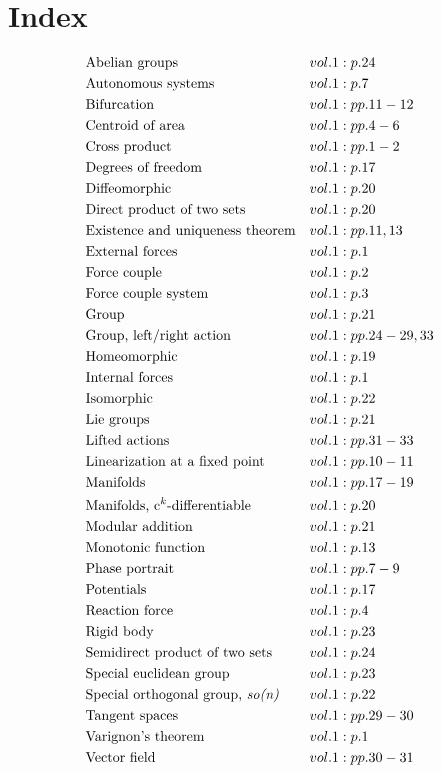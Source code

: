 \documentclass[a4paper]{article}
\begin{document}
 
\section*{Index} 
\begin{align*} 
&\text{Abelian groups}&& vol. 1: p. 24\\
&\text{Autonomous systems}&& vol. 1: p. 7\\
&\text{Bifurcation}&& vol. 1: pp. 11-12\\
&\text{Centroid of area}&& vol. 1: pp. 4-6\\
&\text{Cross product}&& vol. 1: pp. 1-2\\
&\text{Degrees of freedom}&& vol. 1: p. 17\\
&\text{Diffeomorphic}&& vol. 1: p. 20\\
&\text{Direct product of two sets}&& vol. 1: p. 20\\
&\text{Existence and uniqueness theorem}&& vol. 1: pp. 11, 13\\
&\text{External forces}&& vol. 1: p. 1\\
&\text{Force couple}&& vol. 1: p. 2\\
&\text{Force couple system}&& vol. 1: p. 3\\
&\text{Group}&& vol. 1: p. 21\\
&\text{Group, left/right action}&& vol. 1: pp. 24-29, 33\\
&\text{Homeomorphic}&& vol. 1: p. 19\\
&\text{Internal forces}&& vol. 1: p. 1\\
&\text{Isomorphic}&& vol. 1: p. 22\\
&\text{Lie groups}&& vol. 1: p. 21\\
&\text{Lifted actions}&& vol. 1: pp. 31-33\\
&\text{Linearization at a fixed point}&& vol. 1: pp. 10-11\\
&\text{Manifolds}&& vol. 1: pp. 17-19\\
&\text{Manifolds, c$^k$-differentiable}&& vol. 1: p. 20\\
&\text{Modular addition}&& vol. 1: p. 21\\
&\text{Monotonic function}&& vol. 1: p. 13\\
&\text{Phase portrait}&& vol. 1: pp. 7-9\\
&\text{Potentials}&& vol. 1: p. 17\\
&\text{Reaction force}&& vol. 1: p. 4\\
&\text{Rigid body}&& vol. 1: p. 23\\
&\text{Semidirect product of two sets}&& vol. 1: p. 24\\
&\text{Special euclidean group}&& vol. 1: p. 23\\
&\text{Special orthogonal group, \emph{so(n)}}&& vol. 1: p. 22\\
&\text{Tangent spaces}&& vol. 1: pp. 29-30\\
&\text{Varignon's theorem}&& vol. 1: p. 1\\
&\text{Vector field}&& vol. 1: pp. 30-31\\
\end{align*} 
\end{document}
